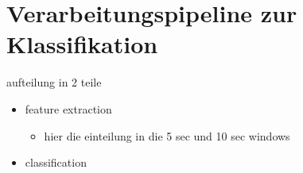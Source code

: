 
\section{Verarbeitungspipeline zur Klassifikation}
\label{ch:Implementierung:classification_pipeline}
aufteilung in 2 teile
\begin{itemize}
  \item feature extraction 
  \begin{itemize}
    \item hier die einteilung in die 5 sec und 10 sec windows
  \end{itemize}
  \item classification 
\end{itemize}
